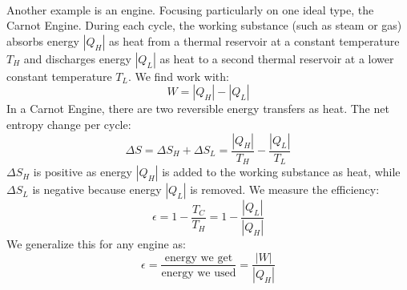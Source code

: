 \documentclass[11pt]{article}
\begin{document}
    \noindent \\Another example is an engine.
    Focusing particularly on one ideal type, the Carnot Engine.
    During each cycle, the working substance (such as steam or gas)
    absorbs energy $|Q_H|$ as heat from a thermal reservoir at a constant
    temperature $T_H$ and discharges energy $|Q_L|$ as heat to a second
    thermal reservoir at a lower constant temperature $T_L$.
    We find work with:
    \begin{equation}
        W = |Q_H| - |Q_L| \tag{Carnot engine work}
    \end{equation}
    In a Carnot Engine, there are two reversible energy transfers as heat.
    The net entropy change per cycle:
    \begin{equation}
        \Delta S = \Delta S_H + \Delta S_L = \frac{|Q_H|}{T_H} - \frac{|Q_L|}{T_L} \tag{entropy, carnot engine}
    \end{equation}
    $\Delta S_H$ is positive as energy $|Q_H|$ is added to the working substance as heat,
    while $\Delta S_L$ is negative because energy $|Q_L|$ is removed.
    We measure the efficiency:
    \begin{equation}
        \epsilon = 1 - \frac{T_C}{T_H} = 1 - \frac{|Q_L|}{|Q_H|} \tag{carnot efficiency}
    \end{equation}
    We generalize this for any engine as:
    \begin{equation}
        \epsilon = \frac{\text{energy we get}}{\text{energy we used}} = \frac{|W|}{|Q_H|} \tag{efficiency, all engines}
    \end{equation}
\end{document}
